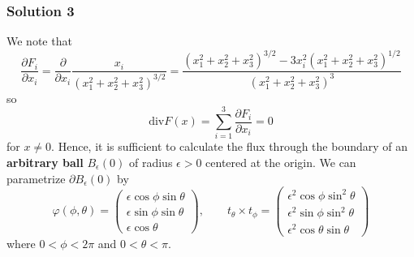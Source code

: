 \documentclass[10pt, t, allowdisplaybreaks]{beamer}
\begin{document}
\begin{frame}
    \frametitle{Solution 3}
    \par We note that 
    \begin{equation*}
        \frac{\partial F_i}{\partial x_i} = \frac{\partial }{\partial x_i}\frac{x_i}{(x_1^2+x_2^2+x_3^2)^{3/2}} = \frac{(x_1^2+x_2^2+x_3^2)^{3/2} - 3x_i^2(x_1^2+x_2^2+x_3^2)^{1/2}}{(x_1^2+x_2^2+x_3^2)^{3}}
    \end{equation*}
    so 
    \begin{equation*}
        \text{div}F(x) = \sum^3_{i = 1}\frac{\partial F_i}{\partial x_i} = 0
    \end{equation*}
    for $x\neq 0$. Hence, it is sufficient to calculate the flux through the boundary of an \textbf{arbitrary ball} $B_\epsilon(0)$ of radius $\epsilon>0$
    centered at the origin. We can parametrize $\partial B_\epsilon(0)$ by 
    \begin{equation*}
        \varphi(\phi, \theta) = \begin{pmatrix}
            \epsilon \cos \phi \sin \theta\\
            \epsilon \sin\phi \sin\theta\\
            \epsilon\cos\theta
        \end{pmatrix}, \qquad
        t_\theta\times t_\phi = \begin{pmatrix}
            \epsilon^2\cos\phi\sin^2\theta\\
            \epsilon^2\sin\phi\sin^2\theta\\
            \epsilon^2\cos\theta\sin\theta
        \end{pmatrix}
    \end{equation*}
    where $0<\phi<2\pi$ and $0<\theta<\pi$. 
\end{frame}
\end{document}
